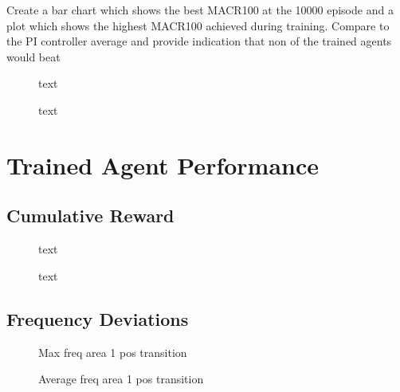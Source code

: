 Create a bar chart which shows the best MACR100 at the 10000 episode and a plot which shows the highest MACR100 achieved during training. Compare to the PI controller average and provide indication that non of the trained agents would beat 

\begin{figure}[h]
	\begin{minipage}{0.45\textwidth}
		\centering
		\resizebox{7cm}{!}{}
		\caption{text}
	\end{minipage}
	\hspace{0.5cm}
	\begin{minipage}{0.45\textwidth}
		\resizebox{7cm}{!}{}
		\caption{text}
	\end{minipage}
\end{figure}
 
\section{Trained Agent Performance}

\subsection{Cumulative Reward}

\begin{figure}[h]
	\begin{minipage}{0.45\textwidth}
		\centering
		\resizebox{7cm}{!}{}
		\caption{text}
	\end{minipage}
	\hspace{0.5cm}
	\begin{minipage}{0.45\textwidth}
		\resizebox{7cm}{!}{}
		\caption{text}
	\end{minipage}
\end{figure}

\subsection{Frequency Deviations}

\begin{figure}[h]
	\begin{minipage}{0.45\textwidth}
		\centering
		\resizebox{7cm}{!}{}
		\caption{Max freq area 1 pos transition}
	\end{minipage}
	\hspace{0.5cm}
	\begin{minipage}{0.45\textwidth}
		\resizebox{7cm}{!}{}
		\caption{Average freq area 1 pos transition}
	\end{minipage}
\end{figure}


